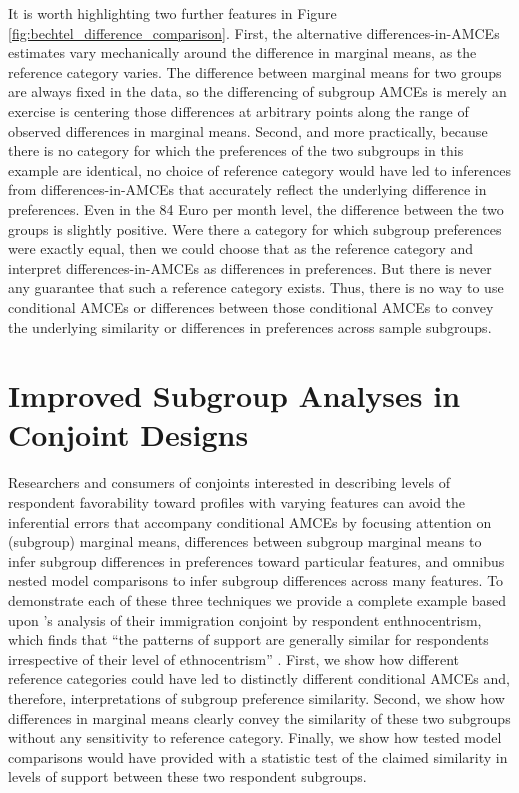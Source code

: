 \documentclass[a4paper,12pt]{article}\usepackage[]{graphicx}\usepackage[]{color}
\begin{document}
It is worth highlighting two further features in Figure \ref{fig:bechtel_difference_comparison}. First, the alternative differences-in-AMCEs estimates vary mechanically around the difference in marginal means, as the reference category varies. The difference between marginal means for two groups are always fixed in the data, so the differencing of subgroup AMCEs is merely an exercise is centering those differences at arbitrary points along the range of observed differences in marginal means. Second, and more practically, because there is no category for which the preferences of the two subgroups in this example are identical, no choice of reference category would have led to inferences from differences-in-AMCEs that accurately reflect the underlying difference in preferences. Even in the 84 Euro per month level, the difference between the two groups is slightly positive. Were there a category for which subgroup preferences were exactly equal, then we could choose that as the reference category and interpret differences-in-AMCEs as differences in preferences. But there is never any guarantee that such a reference category exists. Thus, there is no way to use conditional AMCEs or differences between those conditional AMCEs to convey the underlying similarity or differences in preferences across sample subgroups.


\section*{Improved Subgroup Analyses in Conjoint Designs}\label{sec:marginalmeans}

Researchers and consumers of conjoints interested in describing levels of respondent favorability toward profiles with varying features can avoid the inferential errors that accompany conditional AMCEs by focusing attention on (subgroup) marginal means, differences between subgroup marginal means to infer subgroup differences in preferences toward particular features, and omnibus nested model comparisons to infer subgroup differences across many features. To demonstrate each of these three techniques we provide a complete example based upon \citeauthor{HainmuellerHopkinsYamamoto2014}'s analysis of their immigration conjoint by respondent enthnocentrism, which finds that ``the patterns of support are generally similar for respondents irrespective of their level of ethnocentrism'' \citep[22]{HainmuellerHopkinsYamamoto2014}. First, we show how different reference categories could have led to distinctly different conditional AMCEs and, therefore, interpretations of subgroup preference similarity. Second, we show how differences in marginal means clearly convey the similarity of these two subgroups without any sensitivity to reference category. Finally, we show how tested model comparisons would have provided \citeauthor{HainmuellerHopkinsYamamoto2014} with a statistic test of the claimed similarity in levels of support between these two respondent subgroups.
\end{document}
